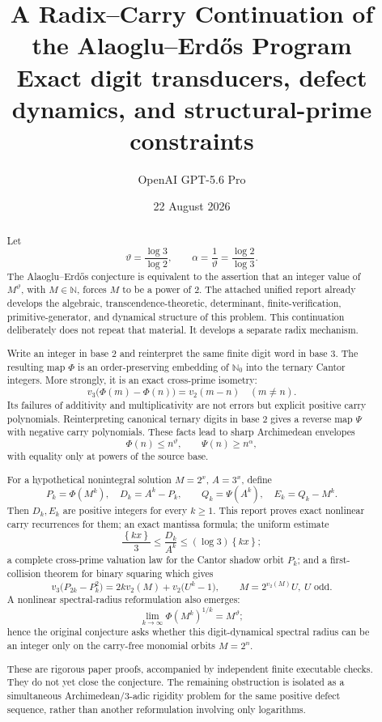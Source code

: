 \documentclass[11pt]{article}
\title{\textbf{A Radix--Carry Continuation of the Alaoglu--Erd\H{o}s Program}\\[0.45em]
\large Exact digit transducers, defect dynamics, and structural-prime constraints}
\author{OpenAI GPT-5.6 Pro}
\date{22 August 2026}
\theoremstyle{definition}
\theoremstyle{remark}
\newcommand{\N}{\mathbb N}
\newcommand{\Nzero}{\mathbb N_0}
\newcommand{\fracpart}[1]{\left\{#1\right\}}
\newcommand{\vTwo}{v_2}
\newcommand{\vThree}{v_3}
\newcommand{\PhiMap}{\Phi}
\newcommand{\PsiMap}{\Psi}
\newcommand{\thetaAE}{\vartheta}
\newcommand{\alphaAE}{\alpha}
\begin{document}
\maketitle

\begin{abstract}
Let
\[
  \thetaAE=\frac{\log 3}{\log 2},\qquad
  \alphaAE=\frac{1}{\thetaAE}=\frac{\log 2}{\log 3}.
\]
The Alaoglu--Erd\H{o}s conjecture is equivalent to the assertion that an
integer value of $M^{\thetaAE}$, with $M\in\N$, forces $M$ to be a power of
$2$.  The attached unified report already develops the algebraic,
transcendence-theoretic, determinant, finite-verification, primitive-generator,
and dynamical structure of this problem.  This continuation deliberately does
not repeat that material.  It develops a separate radix mechanism.

Write an integer in base $2$ and reinterpret the same finite digit word in
base $3$.  The resulting map $\PhiMap$ is an order-preserving embedding of
$\Nzero$ into the ternary Cantor integers.  More strongly, it is an exact
cross-prime isometry:
\[
  \vThree\bigl(\PhiMap(m)-\PhiMap(n)\bigr)=\vTwo(m-n)
  \quad(m\ne n).
\]
Its failures of additivity and multiplicativity are not errors but explicit
positive carry polynomials.  Reinterpreting canonical ternary digits in base
$2$ gives a reverse map $\PsiMap$ with negative carry polynomials.  These facts
lead to sharp Archimedean envelopes
\[
  \PhiMap(n)\le n^{\thetaAE},\qquad
  \PsiMap(n)\ge n^{\alphaAE},
\]
with equality only at powers of the source base.

For a hypothetical nonintegral solution
$M=2^x$, $A=3^x$, define
\[
  P_k=\PhiMap(M^k),\quad D_k=A^k-P_k,
  \qquad Q_k=\PsiMap(A^k),\quad E_k=Q_k-M^k.
\]
Then $D_k,E_k$ are positive integers for every $k\ge1$.  This report proves
exact nonlinear carry recurrences for them; an exact mantissa formula; the
uniform estimate
\[
  \frac{\fracpart{kx}}{3}
  \le \frac{D_k}{A^k}
  \le (\log 3)\fracpart{kx};
\]
a complete cross-prime valuation law for the Cantor shadow orbit $P_k$; and a
first-collision theorem for binary squaring which gives
\[
 \vThree\bigl(P_{2k}-P_k^2\bigr)
 =2k\vTwo(M)+\vTwo\bigl(U^k-1\bigr),
 \qquad M=2^{\vTwo(M)}U,\ U\text{ odd}.
\]
A nonlinear spectral-radius reformulation also emerges:
\[
  \lim_{k\to\infty}\PhiMap(M^k)^{1/k}=M^{\thetaAE};
\]
hence the original conjecture asks whether this digit-dynamical spectral
radius can be an integer only on the carry-free monomial orbits $M=2^n$.

These are rigorous paper proofs, accompanied by independent finite executable
checks.  They do not yet close the conjecture.  The remaining obstruction is
isolated as a simultaneous Archimedean/$3$-adic rigidity problem for the same
positive defect sequence, rather than another reformulation involving only
logarithms.
\end{abstract}
\end{document}
